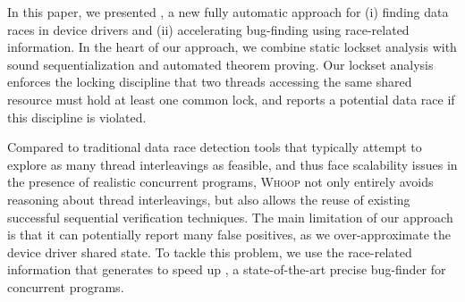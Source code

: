 In this paper, we presented \whoop, a new fully automatic approach for (i) finding data races in device drivers and (ii) accelerating bug-finding using race-related information. In the heart of our approach, we combine static lockset analysis with sound sequentialization and automated theorem proving. Our lockset analysis enforces the locking discipline that two threads accessing the same shared resource must hold at least one common lock, and reports a potential data race if this discipline is violated.

Compared to traditional data race detection tools that typically attempt to explore as many thread interleavings as feasible, and thus face scalability issues in the presence of realistic concurrent programs, \textsc{Whoop} not only entirely avoids reasoning about thread interleavings, but also allows the reuse of existing successful sequential verification techniques. The main limitation of our approach is that it can potentially report many false positives, as we over-approximate the device driver shared state. To tackle this problem, we use the race-related information that \whoop generates to speed up \corral, a state-of-the-art precise bug-finder for concurrent programs.